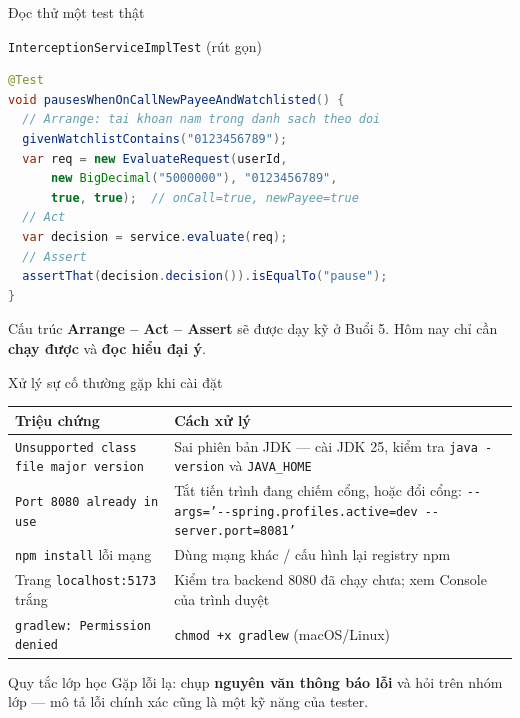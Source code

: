 \documentclass[aspectratio=169,12pt]{beamer}
\begin{document}
\begin{frame}[fragile]{Đọc thử một test thật}
  \begin{block}{\small \texttt{InterceptionServiceImplTest} (rút gọn)}
\begin{lstlisting}[language=java,basicstyle=\ttfamily\footnotesize]
@Test
void pausesWhenOnCallNewPayeeAndWatchlisted() {
  // Arrange: tai khoan nam trong danh sach theo doi
  givenWatchlistContains("0123456789");
  var req = new EvaluateRequest(userId,
      new BigDecimal("5000000"), "0123456789",
      true, true);  // onCall=true, newPayee=true
  // Act
  var decision = service.evaluate(req);
  // Assert
  assertThat(decision.decision()).isEqualTo("pause");
}
\end{lstlisting}
  \end{block}

  \small Cấu trúc \textbf{Arrange -- Act -- Assert} sẽ được dạy kỹ ở Buổi 5.
  Hôm nay chỉ cần \textbf{chạy được} và \textbf{đọc hiểu đại ý}.
\end{frame}

\begin{frame}{Xử lý sự cố thường gặp khi cài đặt}
  \begin{center}
  \footnotesize
  \begin{tabular}{>{\raggedright\arraybackslash}p{5.2cm}>{\raggedright\arraybackslash}p{7.2cm}}
    \toprule
    \textbf{Triệu chứng} & \textbf{Cách xử lý} \\
    \midrule
    \texttt{Unsupported class file major version} & Sai phiên bản JDK --- cài JDK 25,
      kiểm tra \texttt{java -version} và \texttt{JAVA\_HOME} \\
    \texttt{Port 8080 already in use} & Tắt tiến trình đang chiếm cổng, hoặc đổi cổng:
      \texttt{-{}-args='-{}-spring.profiles.active=dev -{}-server.port=8081'} \\
    \texttt{npm install} lỗi mạng & Dùng mạng khác / cấu hình lại registry npm \\
    Trang \texttt{localhost:5173} trắng & Kiểm tra backend 8080 đã chạy chưa;
      xem Console của trình duyệt \\
    \texttt{gradlew: Permission denied} & \texttt{chmod +x gradlew} (macOS/Linux) \\
    \bottomrule
  \end{tabular}
  \end{center}

  \vspace{0.2em}
  \begin{alertblock}{Quy tắc lớp học}
    \small Gặp lỗi lạ: chụp \textbf{nguyên văn thông báo lỗi} và hỏi trên nhóm lớp ---
    mô tả lỗi chính xác cũng là một kỹ năng của tester.
  \end{alertblock}
\end{frame}
\end{document}
